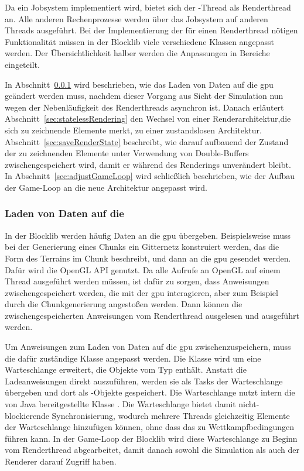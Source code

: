 Da ein Jobsystem implementiert wird, bietet sich der -Thread als Renderthread an. Alle anderen Rechenprozesse werden über das Jobsystem auf anderen Threads ausgeführt. Bei der Implementierung der für einen Renderthread nötigen Funktionalität müssen in der Blocklib viele verschiedene Klassen angepasst werden. Der Übersichtlichkeit halber werden die Anpassungen in Bereiche eingeteilt. 

In Abschnitt~\ref{sec:loader} wird beschrieben, wie das Laden von Daten auf die \ac{gpu} geändert werden muss, nachdem dieser Vorgang aus Sicht der Simulation nun wegen der Nebenläufigkeit des Renderthreads asynchron ist. Danach erläutert Abschnitt~\ref{sec:statelessRendering} den Wechsel von einer Renderarchitektur,die sich zu zeichnende Elemente merkt, zu einer zustandslosen Architektur. Abschnitt~\ref{sec:saveRenderState} beschreibt, wie darauf aufbauend der Zustand der zu zeichnenden Elemente unter Verwendung von Double-Buffers zwischengespeichert wird, damit er während des Renderings unverändert bleibt. In Abschnitt~\ref{sec:adjustGameLoop} wird schließlich beschrieben, wie der Aufbau der Game-Loop an die neue Architektur angepasst wird.

\subsubsection{Laden von Daten auf die }\label{sec:loader}
In der Blocklib werden häufig Daten an die \ac{gpu} übergeben. Beispielsweise muss bei der Generierung eines Chunks ein Gitternetz konstruiert werden, das die Form des Terrains im Chunk beschreibt, und dann an die \ac{gpu} gesendet werden. Dafür wird die OpenGL API genutzt. Da alle Aufrufe an OpenGL auf einem Thread ausgeführt werden müssen, ist dafür zu sorgen, dass Anweisungen zwischengespeichert werden, die mit der \ac{gpu} interagieren, aber zum Beispiel durch die Chunkgenerierung angestoßen werden. Dann können die zwischengespeicherten Anweisungen vom Renderthread ausgelesen und ausgeführt werden. 

Um Anweisungen zum Laden von Daten auf die \ac{gpu} zwischenzuspeichern, muss die dafür zuständige Klasse  angepasst werden. Die Klasse wird um eine Warteschlange erweitert, die Objekte vom Typ  enthält. Anstatt die Ladeanweisungen direkt auszuführen, werden sie als Tasks der Warteschlange übergeben und dort als -Objekte gespeichert. Die Warteschlange nutzt intern die von Java bereitgestellte Klasse . Die Warteschlange bietet damit nicht-blockierende Synchronisierung, wodurch mehrere Threads gleichzeitig Elemente der Warteschlange hinzufügen können, ohne dass das zu Wettkampfbedingungen führen kann. In der Game-Loop der Blocklib wird diese Warteschlange zu Beginn vom Renderthread abgearbeitet, damit danach sowohl die Simulation als auch der Renderer darauf Zugriff haben. 

